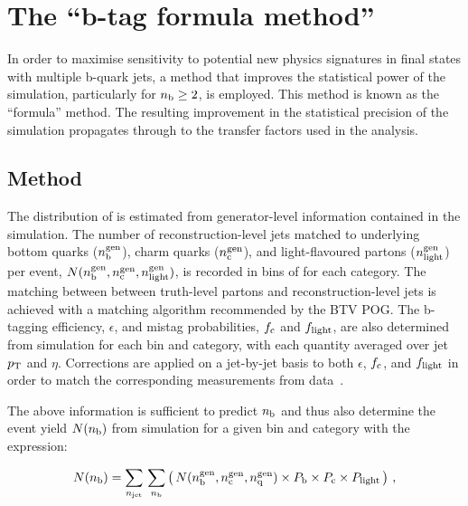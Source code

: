 \section{The ``b-tag formula method''\label{sec:bjets}}

In order to maximise sensitivity to potential new physics signatures
in final states with multiple b-quark jets, a method that improves the
statistical power of the simulation, particularly for $n_{\text{b}} \geq 2$, is
employed. This method is known as the ``formula'' method. The
resulting improvement in the statistical precision of the simulation
propagates through to the transfer factors used in the analysis.

\subsection{Method}

The distribution of \nb is estimated from generator-level information
contained in the simulation. The number of reconstruction-level jets
matched to underlying bottom quarks ($n_{\text{b}}^{\rm gen}$), charm quarks
($n_{\rm c}^{\rm gen}$), and light-flavoured partons ($n_{\rm
  light}^{\rm gen}$) per event, $N(n_{\text{b}}^{\rm gen},n_{\rm c}^{\rm
  gen},n_{\rm light}^{\rm gen})$, is recorded in bins of \scalht for
each \njet category.  The matching between between truth-level partons
and reconstruction-level jets is achieved with a matching algorithm
recommended by the BTV POG.%
The b-tagging efficiency, $\epsilon$, and mistag probabilities,
$f_{\rm c}$ and $f_{\rm light}$, are also determined from simulation
for each \scalht bin and \njet category, with each quantity averaged
over jet $p_{\rm T}$ and $\eta$. Corrections are applied on a
jet-by-jet basis to both $\epsilon$, $f_{\rm c}$, and $f_{\rm light}$
in order to match the corresponding measurements from
data~\cite{CMS-PAS-BTV-12-001}.

The above information is sufficient to predict $n_{\text{b}}$ and thus also
determine the event yield $N(n_{\rm b})$ from simulation for a given
\scalht bin and \njet category with the expression:

\begin{equation}
  \label{equ:btag-formula}
  N(n_{\textrm{b}}) = \sum_{n_{\textrm{jet}}} \, \sum_{n_{\textrm{b}}}
  \left( \, N(n_{\textrm{b}}^{\textrm{gen}},
    n_{\textrm{c}}^{\textrm{gen}}, n_{\textrm{q}}^{\textrm{gen}})
    \times P_{\rm b} \times P_{\rm c} \times P_{\rm light} \, \right) \, , 
\end{equation}

